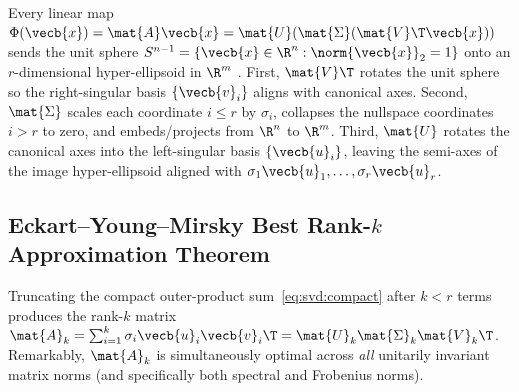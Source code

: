 \documentclass[../../../../master.tex]{subfiles}
\begin{document}
\begin{intuition}
Every linear map $\Phi(\vecb{x}) = \mat{A}\vecb{x} = \mat{U}(\mat{\Sigma}(\mat{V}\T\vecb{x}))$ sends the unit sphere $S^{n-1} = \{\vecb{x} \in \R^n : \norm{\vecb{x}}_2 = 1\}$ onto an $r$-dimensional hyper-ellipsoid in $\R^m$  . First, $\mat{V}\T$ rotates the unit sphere so the right-singular basis $\{\vecb{v}_i\}$ aligns with canonical axes. Second, $\mat{\Sigma}$ scales each coordinate $i \le r$ by $\sigma_i$, collapses the nullspace coordinates $i > r$ to zero, and embeds/projects from $\R^n$ to $\R^m$. Third, $\mat{U}$ rotates the canonical axes into the left-singular basis $\{\vecb{u}_i\}$, leaving the semi-axes of the image hyper-ellipsoid aligned with $\sigma_1\vecb{u}_1, \dots, \sigma_r\vecb{u}_r$.
\end{intuition}


\subsection{Eckart--Young--Mirsky Best Rank-\texorpdfstring{$k$}{k} Approximation Theorem}
\label{subsec:svd:eckart}

Truncating the compact outer-product sum~\eqref{eq:svd:compact} after $k < r$ terms produces the rank-$k$ matrix $\mat{A}_k = \sum_{i=1}^k \sigma_i \vecb{u}_i \vecb{v}_i\T = \mat{U}_k \mat{\Sigma}_k \mat{V}_k\T$. Remarkably, $\mat{A}_k$ is simultaneously optimal across \emph{all} unitarily invariant matrix norms (and specifically both spectral and Frobenius norms).
\end{document}
